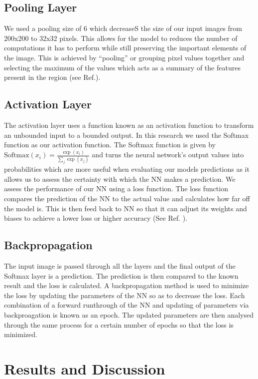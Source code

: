 \documentclass[conference]{IEEEtran}
\begin{document}
\subsection{Pooling Layer}
We used a pooling size of 6 which decreaseS the size of  our input images from 200x200 to 32x32 pixels. This allows for the model to reduces the number of computations it has to perform while still preserving the important elements of the image. This is achieved by “pooling” or grouping pixel values together and selecting the maximum of the values which acts as a summary of the features present in the region (see Ref.\cite{CNNPart1_VZ_2019}).
\subsection{Activation Layer}
The activation layer uses a function known as an activation function to transform an unbounded input to a bounded output. In this research we used the Softmax function as our activation function. The Softmax function is given by $\text{Softmax}(x_{i}) = \frac{\exp(x_i)}{\sum_j \exp(x_j)}$ and turns the neural network's output values into probabilities which are more useful when evaluating our models predictions as it allows us to assess the certainty with which the NN makes a prediction. We assess the performance of our NN using a loss function. The loss function compares the prediction of the NN to the actual value and calculates how far off the model is. This is then feed back to NN so that it can adjust its weights and biases to achieve a lower loss or higher accuracy (See Ref. \cite{Softmax}).

\subsection{Backpropagation}

The input image is passed through all the layers and the final output of the Softmax layer is a prediction. The prediction is then compared to the known result and the loss is calculated. A backpropagation method is used to minimize the loss by updating the parameters of the NN so as to decrease the loss. Each combination of a forward runthrough of  the NN and updating of parameters via backproagation is known as an epoch. The updated parameters are then analysed through the same process for a certain number of epochs so that the loss is minimized.



\section{Results and Discussion}
\end{document}

